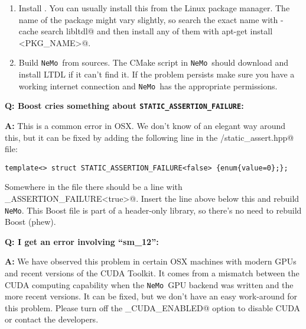 \documentclass[a4paper]{article}
\newcommand{\nemo}{\texttt{NeMo}\xspace}
\newcommand{\code}[1]{\texttt{#1}}
\begin{document}
\begin{enumerate}

  \item Install \verb@libltdl@. You can usually install this from the Linux
  package manager. The name of the package might vary slightly, so search the
  exact name with \verb@apt-cache search libltdl@ and then install any of them
  with \verb@sudo apt-get install <PKG_NAME>@.

  \item Build \nemo\ from sources. The CMake script in \nemo\ should download
  and install LTDL if it can't find it. If the problem persists make sure you
  have a working internet connection and \nemo\ has the appropriate
  permissions.

\end{enumerate}

\vspace{5pt}
\textbf{Q: Boost cries something about \code{STATIC\_ASSERTION\_FAILURE}:}

\textbf{A:} This is a common error in OSX. We don't know of an elegant way
around this, but it can be fixed by adding the following line in the
\verb@boost/static_assert.hpp@ file:

\begin{verbatim}
template<> struct STATIC_ASSERTION_FAILURE<false> {enum{value=0};};
\end{verbatim}

Somewhere in the file there should be a line with
\verb@STATIC_ASSERTION_FAILURE<true>@. Insert the line above below this and
rebuild \nemo. This Boost file is part of a header-only library, so there's no
need to rebuild Boost (phew).

\vspace{5pt}
\textbf{Q: I get an error involving ``sm\_12'':}

\textbf{A:} We have observed this problem in certain OSX machines with modern
GPUs and recent versions of the CUDA Toolkit. It comes from a mismatch between
the CUDA computing capability when the \nemo\ GPU backend was written and the
more recent versions. It can be fixed, but we don't have an easy work-around
for this problem. Please turn off the \verb@NEMO_CUDA_ENABLED@ option to
disable CUDA or contact the developers.


\end{document}
